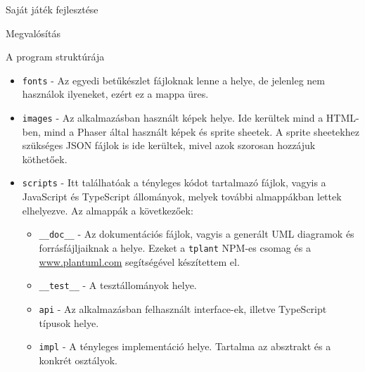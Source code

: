 \begin{MyChapter}{Saját játék fejlesztése}
\begin{MySection}{Megvalósítás}
\begin{MySubSection}{A program struktúrája}
\begin{itemize}
				\item \texttt{fonts} - Az egyedi betűkészlet fájloknak lenne a helye, de jelenleg nem használok ilyeneket, ezért ez a mappa üres.
				
				\item \texttt{images} - Az alkalmazásban használt képek helye. Ide kerültek mind a HTML-ben, mind a Phaser által használt képek és sprite sheetek. A sprite sheetekhez szükséges JSON fájlok is ide kerültek, mivel azok szorosan hozzájuk köthetőek.
				
				\item \texttt{scripts} - Itt találhatóak a tényleges kódot tartalmazó fájlok, vagyis a JavaScript és TypeScript állományok, melyek további almappákban lettek elhelyezve. Az almappák a következőek:
				\begin{itemize}
					\item \texttt{\_\_doc\_\_} - Az dokumentációs fájlok, vagyis a generált UML diagramok és forrásfájljaiknak a helye. Ezeket a \texttt{tplant} NPM-es csomag és a \url{www.plantuml.com} segítségével készítettem el.
					
					\item \texttt{\_\_test\_\_} - A tesztállományok helye.
					
					\item \texttt{api} - Az alkalmazásban felhasznált interface-ek, illetve TypeScript típusok helye.
					
					\item \texttt{impl} - A tényleges implementáció helye. Tartalma az absztrakt és a konkrét osztályok.
				\end{itemize}
			\end{itemize}
		\end{MySubSection}
		

\end{MySection}
\end{MyChapter}

